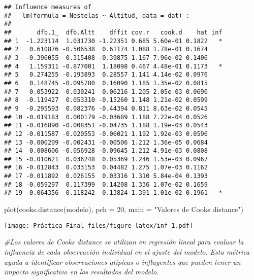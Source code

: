 \documentclass[
]{article}
\newenvironment{Shaded}{\begin{snugshade}}{\end{snugshade}}
\newcommand{\AttributeTok}[1]{\textcolor[rgb]{0.77,0.63,0.00}{#1}}
\newcommand{\CommentTok}[1]{\textcolor[rgb]{0.56,0.35,0.01}{\textit{#1}}}
\newcommand{\DecValTok}[1]{\textcolor[rgb]{0.00,0.00,0.81}{#1}}
\newcommand{\FunctionTok}[1]{\textcolor[rgb]{0.00,0.00,0.00}{#1}}
\newcommand{\NormalTok}[1]{#1}
\newcommand{\StringTok}[1]{\textcolor[rgb]{0.31,0.60,0.02}{#1}}
\begin{document}
\begin{verbatim}
## Influence measures of
##   lm(formula = Nestelas ~ Altitud, data = dat) :
## 
##       dfb.1_  dfb.Altt    dffit cov.r   cook.d    hat inf
## 1  -1.223114  1.031730 -1.22351 0.685 5.60e-01 0.1822   *
## 2   0.610876 -0.506538  0.61174 1.088 1.78e-01 0.1674    
## 3  -0.396055  0.315408 -0.39875 1.167 7.96e-02 0.1406    
## 4   1.159311 -0.877001  1.18098 0.467 4.48e-01 0.1173   *
## 5   0.274255 -0.193893  0.28557 1.141 4.14e-02 0.0976    
## 6   0.148745 -0.095780  0.16090 1.185 1.35e-02 0.0815    
## 7   0.053922 -0.030241  0.06216 1.205 2.05e-03 0.0690    
## 8  -0.119427  0.053310 -0.15260 1.148 1.21e-02 0.0599    
## 9  -0.295593  0.082376 -0.44394 0.811 8.63e-02 0.0545    
## 10 -0.019183  0.000179 -0.03689 1.188 7.22e-04 0.0526    
## 11 -0.016890 -0.008351 -0.04735 1.188 1.19e-03 0.0543    
## 12 -0.011587 -0.020553 -0.06021 1.192 1.92e-03 0.0596    
## 13 -0.000209 -0.002431 -0.00506 1.212 1.36e-05 0.0684    
## 14  0.008606 -0.056928 -0.09645 1.212 4.91e-03 0.0808    
## 15 -0.010621  0.036248  0.05369 1.246 1.53e-03 0.0967    
## 16 -0.012843  0.033153  0.04482 1.275 1.07e-03 0.1162    
## 17 -0.011892  0.026155  0.03316 1.310 5.84e-04 0.1393    
## 18 -0.059297  0.117399  0.14208 1.336 1.07e-02 0.1659    
## 19 -0.064356  0.118242  0.13824 1.391 1.01e-02 0.1961   *
\end{verbatim}

\begin{Shaded}
\begin{Highlighting}[]
\FunctionTok{plot}\NormalTok{(}\FunctionTok{cooks.distance}\NormalTok{(modelo), }\AttributeTok{pch =} \DecValTok{20}\NormalTok{, }\AttributeTok{main =} \StringTok{"Valores de Cook\textquotesingle{}s distance"}\NormalTok{)}
\end{Highlighting}
\end{Shaded}

\texttt{[image: Práctica\_Final\_files/figure-latex/inf-1.pdf]}

\begin{Shaded}
\begin{Highlighting}[]
\CommentTok{\#Los valores de Cook\textquotesingle{}s distance se utilizan en regresión lineal para evaluar la influencia de cada observación individual en el ajuste del modelo. Esta métrica ayuda a identificar observaciones atípicas o influyentes que pueden tener un impacto significativo en los resultados del modelo.}
\end{Highlighting}
\end{Shaded}
\end{document}
